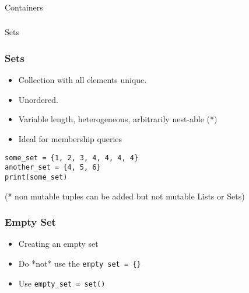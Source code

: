 \begin{frame}[fragile]\frametitle{}
\begin{center}
{\Large Containers}
\end{center}
\end{frame}


\begin{frame}[fragile]\frametitle{}
\begin{center}
{\Large Sets}
\end{center}
\end{frame}


\begin{frame}[fragile]\frametitle{Sets}
  \begin{itemize}
  \item Collection with all elements  unique.
  \item Unordered. 
  \item Variable length, heterogeneous, arbitrarily nest-able (*)
  \item Ideal for membership queries
  \end{itemize}
  \begin{lstlisting}
some_set = {1, 2, 3, 4, 4, 4, 4}
another_set = {4, 5, 6}
print(some_set)
\end{lstlisting}

(* non mutable tuples can be added but not mutable Lists or Sets)
\end{frame}

\begin{frame}[fragile]\frametitle{Empty Set}
  \begin{itemize}
  \item Creating an empty set
\item Do  *not* use the \lstinline|empty set = {}|
\item Use \lstinline|empty_set = set()|
  \end{itemize}

\end{frame}

